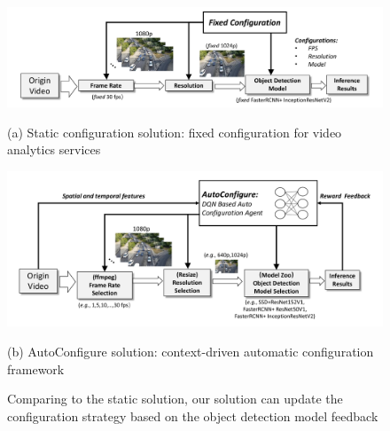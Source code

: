 \begin{figure}[!t]
	\begin{minipage}{\linewidth}
		\centerline{\includegraphics[width=0.8\linewidth]{figures/static_framework.pdf}}
		\begin{center}
			{(a) Static configuration solution: fixed configuration for video analytics services}
		\end{center}
	\end{minipage}
	\vfill
	\vspace{0.4cm}
	\begin{minipage}{\linewidth}
		\centerline{\includegraphics[width=0.8\linewidth]{figures/auto_framework.pdf}}
		\vspace{0.2cm}
		\begin{center}
			{(b) AutoConfigure solution: context-driven automatic configuration framework}
		\end{center}
	\end{minipage}
	\caption{Comparing to the static solution, our solution can update the configuration strategy based on the object detection model feedback}
	\label{fig: framework}
\end{figure}



